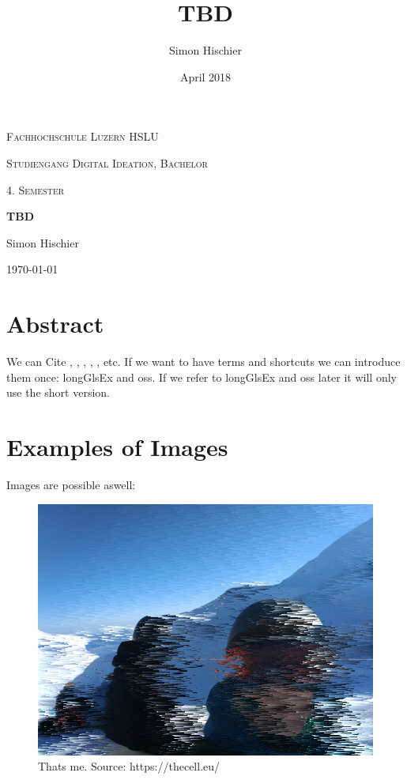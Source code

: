 \documentclass[10pt]{article}
\title{TBD}
\author{Simon Hischier}
\date{April 2018}
\begin{document}
\begin{titlepage}
\centering
\vspace{1cm}
	{\scshape\LARGE Fachhochschule Luzern HSLU \par}
	\vspace{1cm}
	{\scshape\Large Studiengang Digital Ideation, Bachelor \par}
	
	{\scshape\Large 4. Semester\par}
	\vspace{1.5cm}
	{\huge\bf TBD\par}
	
	\vspace{10cm}
	{\Large Simon Hischier\par}
	\vfill

	{\large \today\par}
\end{titlepage}

\renewcommand{\contentsname}{Inhalt}
\tableofcontents
\newpage

\section{Abstract}
We can Cite \cite{wikipediaScriptingLanguage}, \cite{Iivari2008usabilityInCompanyOSS}, \cite{almarzouq2005open}, \cite{heiseonline2017limuxservus}, \cite{viorres2007major}, \cite{wikipediaScriptingLanguage} etc. If we want to have terms and shortcuts we can introduce them once: \gls{longGlsEx} and \gls{oss}. If we refer to \gls{longGlsEx} and \gls{oss} later it will only use the short version.

\section{Examples of Images}
Images are possible aswell:
\begin{figure}[H]
	\includegraphics[width=\textwidth, height=\textheight, keepaspectratio]{example1.png}
	\caption{Thats me. Source: {https://thecell.eu/}}
\end{figure}
\end{document}
